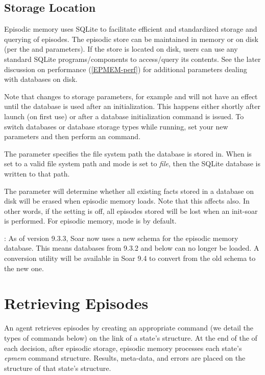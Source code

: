 \subsection{Storage Location}

Episodic memory uses SQLite to facilitate efficient and standardized storage and querying of episodes.  
The episodic store can be maintained in memory or on disk (per the  and  parameters).  
If the store is located on disk, users can use any standard SQLite programs/components to access/query its contents. 
See the later discussion on performance (\ref{EPMEM-perf}) for additional parameters dealing with databases on disk.

Note that changes to storage parameters, for example  and  will not have an effect until the database is used after an initialization. This happens either shortly after launch (on first use) or after a database initialization command is issued. To switch databases or database storage types while running, set your new parameters and then perform an  command.

The  parameter specifies the file system path the database is stored in. When  is set to a valid file system path and  mode is set to \emph{file}, then the SQLite database is written to that path.

The  parameter will determine whether all existing facts stored in a database on disk will be erased when episodic memory loads. Note that this affects  also.  In other words, if the  setting is off, all episodes stored will be lost when an init-soar is performed. For episodic memory,  mode is  by default.

: As of version 9.3.3, Soar now uses a new schema for the episodic memory database. This means databases from 9.3.2 and below can no longer be loaded.  A conversion utility will be available in Soar 9.4 to convert from the old schema to the new one.

\section{Retrieving Episodes}
\label{EPMEM-retrieval}

An agent retrieves episodes by creating an appropriate command (we detail the types of commands below) on the  link of a state's  structure. 
At the end of the  of each decision, after episodic storage, episodic memory processes each state's \emph{epmem} command structure.  
Results, meta-data, and errors are placed on the  structure of that state's  structure.

